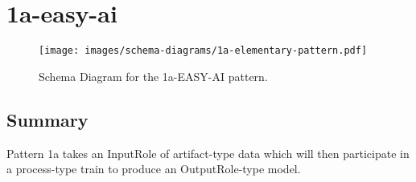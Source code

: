 \section{1a-easy-ai}
\label{sec:1a}
\begin{figure}[h!]
\begin{center}
\texttt{[image: images/schema-diagrams/1a-elementary-pattern.pdf]}
\end{center}
\caption{Schema Diagram for the 1a-EASY-AI pattern. %
}
\label{fig:nen-accepts}
\end{figure}
\subsection{Summary}
Pattern 1a takes an InputRole of artifact-type data which will then participate in a process-type train to produce an OutputRole-type model. 
\label{sum:1a}

